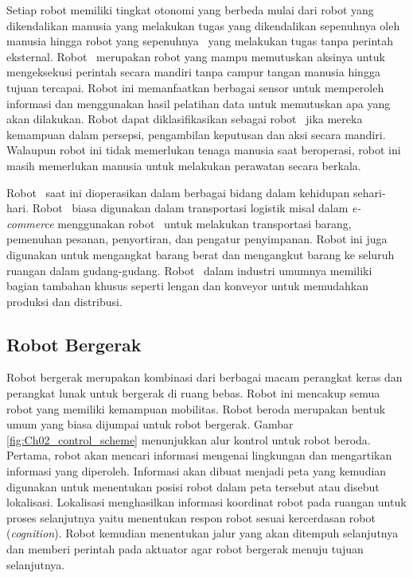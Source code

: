 Setiap robot memiliki tingkat otonomi yang berbeda mulai dari robot yang dikendalikan manusia yang melakukan tugas yang dikendalikan sepenuhnya oleh manusia hingga robot yang sepenuhnya \auto\ yang melakukan tugas tanpa perintah eksternal. Robot \auto\ merupakan robot yang mampu memutuskan aksinya untuk mengeksekusi perintah secara mandiri tanpa campur tangan manusia hingga tujuan tercapai\cite{b2}. Robot ini memanfaatkan berbagai sensor untuk memperoleh informasi dan menggunakan hasil pelatihan data untuk memutuskan apa yang akan dilakukan. Robot dapat diklasifikasikan sebagai robot \auto\ jika mereka kemampuan dalam persepsi, pengambilan keputusan dan aksi secara mandiri. Walaupun robot ini tidak memerlukan tenaga manusia saat beroperasi, robot ini masih memerlukan manusia untuk melakukan perawatan secara berkala.

Robot \auto\ saat ini dioperasikan dalam berbagai bidang dalam kehidupan sehari-hari. 
Robot \auto\ biasa digunakan dalam transportasi logistik misal dalam \textit{e-commerce} menggunakan robot \auto\ untuk melakukan transportasi barang, pemenuhan pesanan, penyortiran, dan pengatur penyimpanan. Robot ini juga digunakan untuk mengangkat barang berat dan mengangkut barang ke seluruh ruangan dalam gudang-gudang. 
Robot \auto\ dalam industri umumnya memiliki bagian tambahan khusus seperti lengan dan konveyor untuk memudahkan produksi dan distribusi.

\subsection{Robot Bergerak}
\label{sec:Robot_Bergerak}

Robot bergerak merupakan kombinasi dari berbagai macam perangkat keras dan perangkat lunak untuk bergerak di ruang bebas. Robot ini mencakup semua robot yang memiliki kemampuan mobilitas. Robot beroda merupakan bentuk umum yang biasa dijumpai untuk robot bergerak. Gambar \ref*{fig:Ch02_control_scheme} menunjukkan alur kontrol untuk robot beroda. Pertama, robot akan mencari informasi mengenai lingkungan dan mengartikan informasi yang diperoleh. Informasi akan dibuat menjadi peta yang kemudian digunakan untuk menentukan posisi robot dalam peta tersebut atau disebut lokalisasi. Lokalisasi menghasilkan informasi koordinat robot pada ruangan untuk proses selanjutnya yaitu menentukan respon robot sesuai kercerdasan robot (\textit{cognition}). Robot kemudian menentukan jalur yang akan ditempuh selanjutnya dan memberi perintah pada aktuator agar robot bergerak menuju tujuan selanjutnya. 

